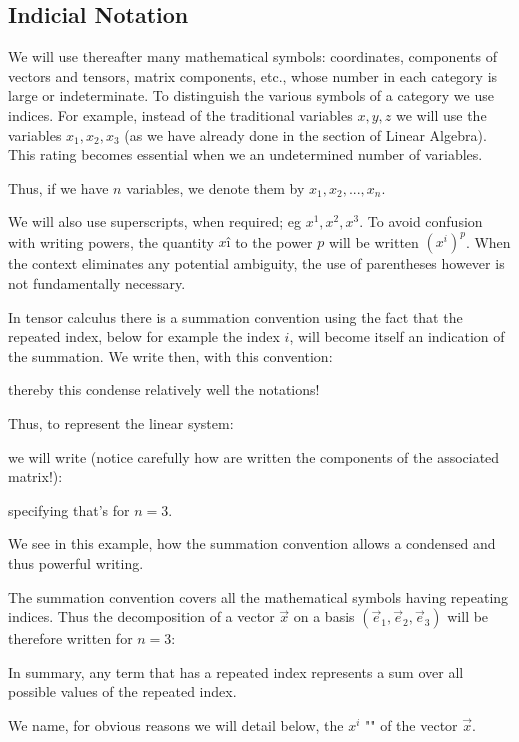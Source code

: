 	\pagebreak
	\subsection{Indicial Notation}
	We will use thereafter many mathematical symbols: coordinates, components of vectors and tensors, matrix components, etc., whose number in each category is large or indeterminate. To distinguish the various symbols of a category we use indices. For example, instead of the traditional variables $x, y, z$ we will use the variables $x_1,x_2,x_3$ (as we have already done in the section of Linear Algebra). This rating becomes essential when we an undetermined number of variables.
	
	Thus, if we have $n$ variables, we denote them by $x_1,x_2,...,x_n$.
	
	We will also use superscripts, when required; eg $x^1,x^2,x^3$. To avoid confusion with writing powers, the quantity $xî$ to the power $p$ will be written $(x^i)^p$. When the context eliminates any potential ambiguity, the use of parentheses however is not fundamentally necessary.
	
	In tensor calculus there is a summation convention using the fact that the repeated index, below for example the index $i$, will become itself an indication of the summation. We write then, with this convention:
	
	thereby this condense relatively well the notations!
	
	Thus, to represent the linear system:
	
	we will write (notice carefully how are written the components of the associated matrix!):
	
	specifying that's for $n=3$.
	
	We see in this example, how the summation convention allows a condensed and thus powerful writing.
	
	The summation convention covers all the mathematical symbols having repeating indices. Thus the decomposition of a vector $\vec{x}$ on a basis $(\vec{e}_1,\vec{e}_2,\vec{e}_3)$ will be therefore written for $n=3$:
	
	In summary, any term that has a repeated index represents a sum over all possible values of the repeated index.
	
	\begin{tcolorbox}[title=Remark,colframe=black,arc=10pt]
	We name, for obvious reasons we will detail below, the $x^i$ "" of the vector $\vec{x}$.
	\end{tcolorbox}
	
